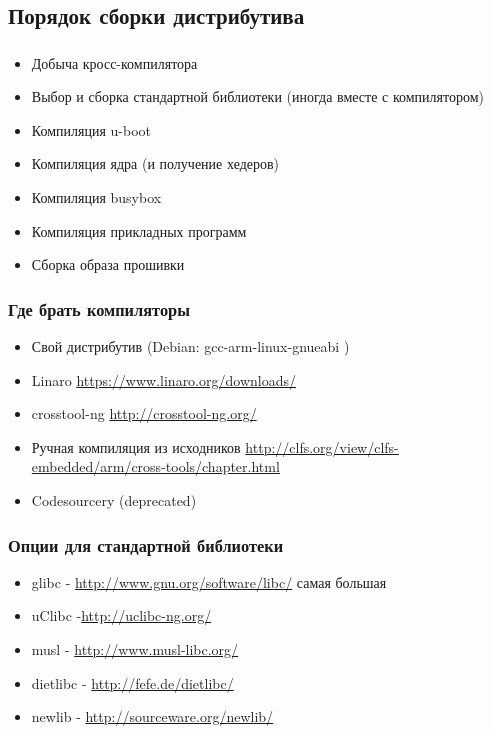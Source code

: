 \subsection{Порядок сборки дистрибутива}

\begin{frame}
  \frametitle{}
  \begin{itemize}
      \item Добыча кросс-компилятора
      \item Выбор и сборка стандартной библиотеки (иногда вместе с компилятором)
      \item Компиляция u-boot
      \item Компиляция ядра (и получение хедеров)
      \item Компиляция busybox
      \item Компиляция прикладных программ
      \item Сборка образа прошивки
  \end{itemize}
\end{frame}

\begin{frame}
  \frametitle{Где брать компиляторы}
  \begin{itemize}
    \item Свой дистрибутив (Debian: gcc-arm-linux-gnueabi )
    \item Linaro \url{https://www.linaro.org/downloads/}
    \item crosstool-ng \url{http://crosstool-ng.org/}
    \item Ручная компиляция из исходников \url{http://clfs.org/view/clfs-embedded/arm/cross-tools/chapter.html}
    \item Codesourcery (deprecated)
  \end{itemize}
\end{frame}

\begin{frame}
  \frametitle{Опции для стандартной библиотеки}
  \begin{itemize}
      \item glibc - \url{http://www.gnu.org/software/libc/} самая большая
      \item uClibc -\url{http://uclibc-ng.org/}
      \item musl - \url{http://www.musl-libc.org/}
      \item dietlibc - \url{http://fefe.de/dietlibc/} 
      \item newlib - \url{http://sourceware.org/newlib/}
  \end{itemize}
\end{frame}


